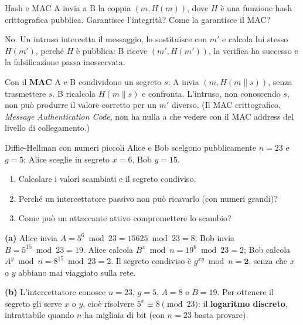 \begin{esercizio}{Hash e MAC}
A invia a B la coppia $(m, H(m))$, dove $H$ è una funzione hash crittografica pubblica. Garantisce l'integrità? Come la garantisce il
MAC?
\end{esercizio}

\svolgimento
No. Un intruso intercetta il messaggio, lo sostituisce con $m'$ e calcola lui stesso $H(m')$, perché $H$ è pubblica: B riceve $(m', H(m'))$,
la verifica ha successo e la falsificazione passa inosservata.

Con il \textbf{MAC} A e B condividono un segreto $s$: A invia $(m, H(m \| s))$, senza trasmettere $s$. B ricalcola $H(m \| s)$ e confronta.
L'intruso, non conoscendo $s$, non può produrre il valore corretto per un $m'$ diverso. (Il MAC crittografico, \emph{Message Authentication
Code}, non ha nulla a che vedere con il MAC address del livello di collegamento.)

\begin{esercizio}{Diffie-Hellman con numeri piccoli}
Alice e Bob scelgono pubblicamente $n = 23$ e $g = 5$; Alice sceglie in segreto $x = 6$, Bob $y = 15$.
\begin{enumerate}[label=(\alph*)]
    \item Calcolare i valori scambiati e il segreto condiviso.
    \item Perché un intercettatore passivo non può ricavarlo (con numeri grandi)?
    \item Come può un attaccante attivo compromettere lo scambio?
\end{enumerate}
\end{esercizio}

\svolgimento
\textbf{(a)} Alice invia $A = 5^6 \bmod 23 = 15625 \bmod 23 = 8$; Bob invia $B = 5^{15} \bmod 23 = 19$.
Alice calcola $B^x \bmod n = 19^6 \bmod 23 = 2$; Bob calcola $A^y \bmod n = 8^{15} \bmod 23 = 2$. Il segreto condiviso è
$g^{xy} \bmod n = \mathbf{2}$, senza che $x$ o $y$ abbiano mai viaggiato sulla rete.


\textbf{(b)} L'intercettatore conosce $n = 23$, $g = 5$, $A = 8$ e $B = 19$. Per ottenere il segreto gli serve $x$ o $y$, cioè risolvere
$5^x \equiv 8 \pmod{23}$: il \textbf{logaritmo discreto}, intrattabile quando $n$ ha migliaia di bit (con $n = 23$ basta provare).

